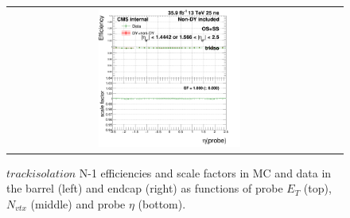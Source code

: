 \begin{figure}[bh]
\begin{center}
\begin{tabular}{cc}
      \includegraphics[width=0.45\textwidth]{figures/Zprime/2016/ScaleFactor/SameSign/N_1_eff/g_compare_cut_eta_Barrel+Endcap_ea_ta_inc_AS_N_1_TrkIso_PUW.png}
    \end{tabular}
    \caption{$track isolation$ N-1 efficiencies and scale factors in MC and data in the barrel (left) and endcap (right) as functions of probe $E_T$ (top), $N_{vtx}$ (middle) and probe $\eta$ (bottom).}
    \label{fig:TrkIso_2016}
  \end{center}
\end{figure}

